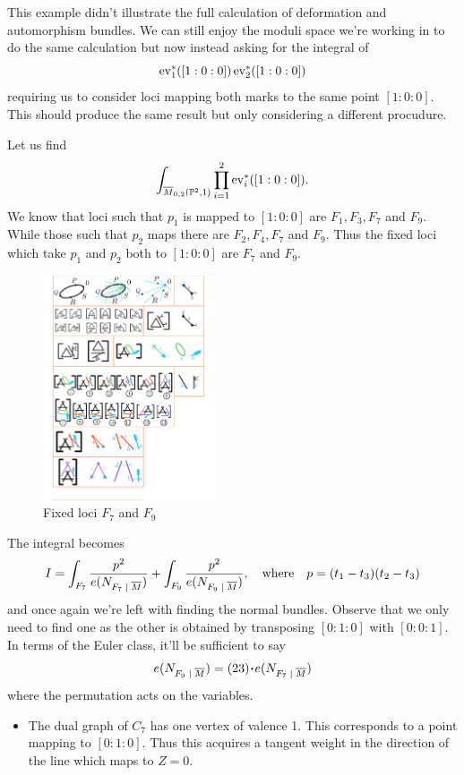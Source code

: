 \documentclass[12pt]{memoir}
\begin{document}
This example didn't illustrate the full calculation of deformation and automorphism bundles. We can still enjoy the moduli space we're working in to do the same calculation but now instead asking for the integral of 
$$\operatorname{ev}_1^\ast([1:0:0])\operatorname{ev}_2^\ast([1:0:0])$$
requiring us to consider loci mapping both marks to the same point $[1:0:0]$. This should produce the same result but only considering a different procudure.

\begin{Ex}
    Let us find 
    $$\int_{\overline{M}_{0,2}(\mathbb{P}^2,1)}\prod_{i=1}^{2}\operatorname{ev}_i^\ast([1:0:0]).$$
    We know that loci such that $p_1$ is mapped to $[1:0:0]$ are $F_1,F_3,F_7$ and $F_9$. While those such that $p_2$ maps there are $F_2,F_4,F_7$ and $F_9$. Thus the fixed loci which take $p_1$ and $p_2$ both to $[1:0:0]$ are $F_7$ and $F_9$.
    \begin{figure}[h!]
        \centering
        \includegraphics[width=0.45\textwidth, trim= 1.32cm 17cm 13.1cm 8cm,clip]{../figs/FigsDNnotability3.pdf}
        \caption{Fixed loci $F_7$ and $F_9$}
        \label{fig:fixed-loci-M02P21-F7-F9}
    \end{figure}
    The integral becomes 
    $$I=\int_{F_7}\frac{p^2}{e(N_{F_7\mid\ov M})}+\int_{F_9}\frac{p^2}{e(N_{F_9\mid\ov M})},\word{where}p=(t_1-t_3)(t_2-t_3)$$
    and once again we're left with finding the normal bundles. Observe that we only need to find one as the other is obtained by transposing $[0:1:0]$ with $[0:0:1]$. In terms of the Euler class, it'll be sufficient to say 
    $$e(N_{F_9\mid\ov M})=(23)\.e(N_{F_7\mid\ov M})$$
    where the permutation acts on the variables.
    \begin{itemize}
        \item The dual graph of $C_7$ has one vertex of valence 1. This corresponds to a point mapping to $[0:1:0]$. Thus this acquires a tangent weight in the direction of the line which maps to $Z=0$.

\end{itemize}
\end{Ex}
\end{document}
